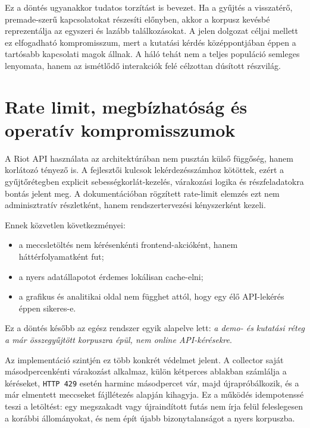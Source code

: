 \documentclass[a4paper,12pt]{report}
\begin{document}
Ez a döntés ugyanakkor tudatos torzítást is bevezet. Ha a gyűjtés a visszatérő, premade-szerű kapcsolatokat részesíti előnyben, akkor a korpusz kevésbé reprezentálja az egyszeri és lazább találkozásokat. A jelen dolgozat céljai mellett ez elfogadható kompromisszum, mert a kutatási kérdés középpontjában éppen a tartósabb kapcsolati magok állnak. A háló tehát nem a teljes populáció semleges lenyomata, hanem az ismétlődő interakciók felé célzottan dúsított részvilág.

\section{Rate limit, megbízhatóság és operatív kompromisszumok}

A Riot API használata az architektúrában nem pusztán külső függőség, hanem korlátozó tényező is. A fejlesztői kulcsok lekérdezésszámhoz kötöttek, ezért a gyűjtőrétegben explicit sebességkorlát-kezelés, várakozási logika és részfeladatokra bontás jelent meg. A dokumentációban rögzített rate-limit elemzés ezt nem adminisztratív részletként, hanem rendszertervezési kényszerként kezeli.

Ennek közvetlen következményei:

\begin{itemize}
    \item a meccsletöltés nem kérésenkénti frontend-akcióként, hanem háttérfolyamatként fut;
    \item a nyers adatállapotot érdemes lokálisan cache-elni;
    \item a grafikus és analitikai oldal nem függhet attól, hogy egy élő API-lekérés éppen sikeres-e.
\end{itemize}

Ez a döntés később az egész rendszer egyik alapelve lett: \emph{a demo- és kutatási réteg a már összegyűjtött korpuszra épül, nem online API-kérésekre}.

Az implementáció szintjén ez több konkrét védelmet jelent. A collector saját másodpercenkénti várakozást alkalmaz, külön kétperces ablakban számlálja a kéréseket, \texttt{HTTP 429} esetén harminc másodpercet vár, majd újrapróbálkozik, és a már elmentett meccseket fájllétezés alapján kihagyja. Ez a működés idempotenssé teszi a letöltést: egy megszakadt vagy újraindított futás nem írja felül feleslegesen a korábbi állományokat, és nem épít újabb bizonytalanságot a nyers korpuszba.
\end{document}
